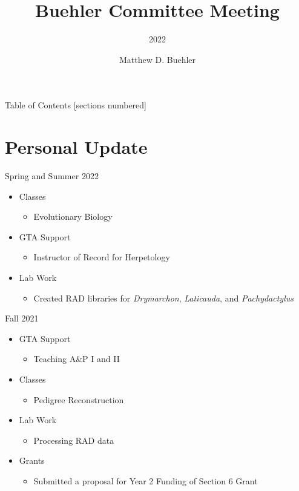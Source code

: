 \documentclass[10pt,aspectratio=169]{beamer}
\title{Buehler Committee Meeting}
\subtitle{2022}
\date{}
\author{Matthew D. Buehler}
\institute{Department of Biological Sciences}
\begin{document}
\maketitle

\begin{frame}{Table of Contents}
  [sections numbered]
  \tableofcontents%
\end{frame}

\section[Personal Update]{Personal Update}

\begin{frame}{Spring and Summer 2022}  
\begin{itemize}
  \item Classes
    \begin{itemize}
      \item Evolutionary Biology
    \end{itemize}
  \item GTA Support
    \begin{itemize}
    \item Instructor of Record for Herpetology
    \end{itemize}
  \item Lab Work
    \begin{itemize}
      \item Created RAD libraries for \textit{Drymarchon}, \textit{Laticauda}, and \textit{Pachydactylus}
    \end{itemize}
\end{itemize}
\end{frame}

\begin{frame}{Fall 2021}
  \begin{itemize}
    \item GTA Support
    \begin{itemize}
      \item Teaching A\&P I and II 
    \end{itemize}
    \item Classes
    \begin{itemize}
      \item Pedigree Reconstruction
    \end{itemize}
    \item Lab Work
    \begin{itemize}
      \item Processing RAD data
    \end{itemize}
    \item Grants
    \begin{itemize}
      \item Submitted a proposal for Year 2 Funding of Section 6 Grant
    \end{itemize}
    
  \end{itemize}
\end{frame}
\end{document}

